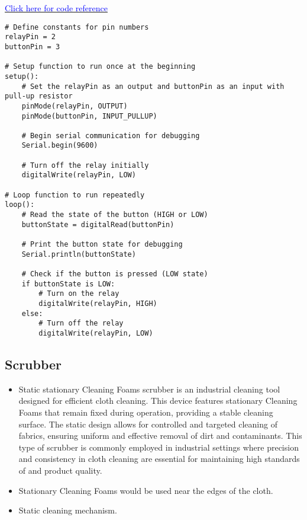 \documentclass[table,french,english]{rapportCS}
\begin{document}
\href{https://github.com/naunidhsingh03/ELP305-TribeD-Resources/blob/5ba1988fe283faba21ba7098978bb225e509d5cb/Codes/solvent_spinkler_new_design_1.ino}{\textcolor{blue}{Click here for code reference}}

\begin{lstlisting}
# Define constants for pin numbers
relayPin = 2
buttonPin = 3

# Setup function to run once at the beginning
setup():
    # Set the relayPin as an output and buttonPin as an input with pull-up resistor
    pinMode(relayPin, OUTPUT)
    pinMode(buttonPin, INPUT_PULLUP)
    
    # Begin serial communication for debugging
    Serial.begin(9600)
    
    # Turn off the relay initially
    digitalWrite(relayPin, LOW)

# Loop function to run repeatedly
loop():
    # Read the state of the button (HIGH or LOW)
    buttonState = digitalRead(buttonPin)
    
    # Print the button state for debugging
    Serial.println(buttonState)
    
    # Check if the button is pressed (LOW state)
    if buttonState is LOW:
        # Turn on the relay
        digitalWrite(relayPin, HIGH)
    else:
        # Turn off the relay
        digitalWrite(relayPin, LOW)
\end{lstlisting}


\subsection{Scrubber}
\begin{itemize}[label=$\bullet$]
    \item Static stationary Cleaning Foams scrubber is an industrial cleaning tool designed for efficient cloth cleaning. This device features stationary Cleaning Foams that remain fixed during operation, providing a stable cleaning surface. The static design allows for controlled and targeted cleaning of fabrics, ensuring uniform and effective removal of dirt and contaminants. This type of scrubber is commonly employed in industrial settings where precision and consistency in cloth cleaning are essential for maintaining high standards of  and product quality.
    \item Stationary Cleaning Foams would be used near the edges of the cloth.
    \item Static cleaning mechanism.
    
\end{itemize}
\end{document}
